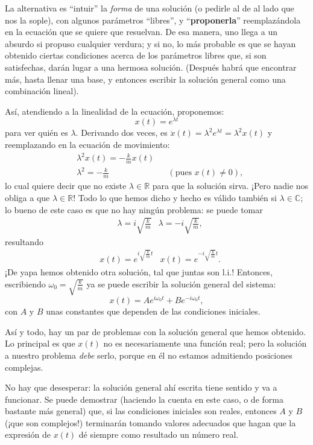\documentclass[a4paper,spanish]{article}
\def\C {\mathbb{C}}
\def\R {\mathbb{R}}
\numberwithin{equation}{section}
\begin{document}
La alternativa es ``intuir'' la \textit{forma} de una soluci\'on (o pedirle al de al lado que nos la sople), con algunos par\'ametros ``libres'', y ``\textbf{proponerla}'' reemplaz\'andola en la ecuaci\'on que se quiere que resuelvan. De esa manera, uno llega a un absurdo si propuso cualquier verdura; y si no, lo m\'as probable es que se hayan obtenido ciertas condiciones acerca de los par\'ametros libres que, si son satisfechas, dar\'an lugar a una hermosa soluci\'on. (Despu\'es habr\'a que encontrar m\'as, hasta llenar una base, y entonces escribir la soluci\'on general como una combinaci\'on lineal).

As\'i, atendiendo a la linealidad de la ecuaci\'on, proponemos:
		\begin{equation*}
				x(t)=e^{\lambda t}
		\end{equation*}
para ver qui\'en es $\lambda$. Derivando dos veces, es $\ddot{x}(t)=\lambda^2 e^{\lambda t}=\lambda^2 x(t)$ y reemplazando en la ecuaci\'on de movimiento:
		\begin{align*}
				&\lambda^2 x(t) = -\frac{k}{m} x(t)\\
				&\lambda^2 = -\frac{k}{m} & &(\text{pues }x(t)\neq0),
		\end{align*}
lo cual quiere decir que no existe $\lambda\in\R$ para que la soluci\'on sirva. ¡Pero nadie nos obliga a que $\lambda\in\R$! Todo lo que hemos dicho y hecho es v\'alido tambi\'en si $\lambda\in\C$; lo bueno de este caso es que no hay ning\'un problema: se puede tomar
		\begin{align*}
				&\lambda=i\sqrt{\frac{k}{m}}&\lambda=-i\sqrt{\frac{k}{m}},
		\end{align*}
resultando
		\begin{align*}
				&x(t)=e^{i\sqrt{\frac{k}{m}}t} & x(t)=e^{-i\sqrt{\frac{k}{m}}t}.
		\end{align*}
¡De yapa hemos obtenido otra soluci\'on, tal que juntas son l.i.! Entonces, escribiendo $\omega_0=\sqrt{\frac{k}{m}}$ ya se puede escribir la soluci\'on general del sistema:
		\[
			x(t) = Ae^{i\omega_0 t} + Be^{-i\omega_0 t},
		\]
con $A$ y $B$ unas constantes que dependen de las condiciones iniciales.

As\'i y todo, hay un par de problemas con la soluci\'on general que hemos obtenido. Lo principal es que $x(t)$ no es necesariamente una funci\'on real; pero la soluci\'on a nuestro problema \textit{debe} serlo, porque en \'el no estamos admitiendo posiciones complejas.

No hay que desesperar: la soluci\'on general ah\'i escrita tiene sentido y va a funcionar. Se puede demostrar (haciendo la cuenta en este caso, o de forma bastante m\'as general) que, si las condiciones iniciales son reales, entonces $A$ y $B$ (¡que son complejos!) terminar\'an tomando valores adecuados que hagan que la expresi\'on de $x(t)$ d\'e siempre como resultado un n\'umero real.
\end{document}
